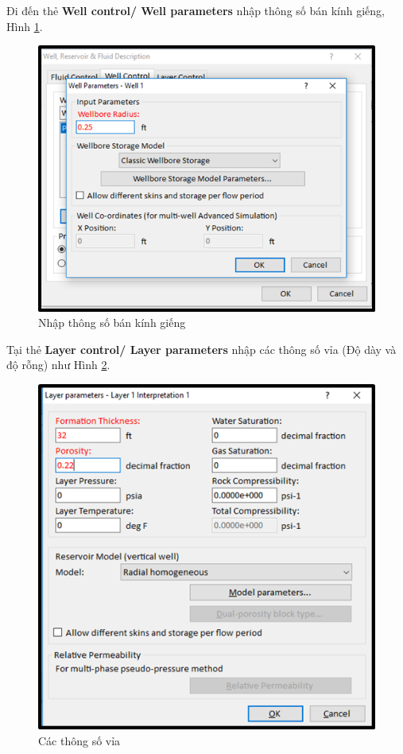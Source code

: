 \documentclass[12pt,a4paper]{report}
\begin{document}
    \clearpage
    \noindent
Đi đến thẻ \textbf{Well control/ Well parameters} nhập thông số bán kính giếng, Hình \ref{fig:w_radius}.
    \begin{figure}[h]
    	\centering
        \includegraphics[scale=1]{welltest/well_radius.png}
        \caption{Nhập thông số bán kính giếng}
        \label{fig:w_radius}
    \end{figure}
    \clearpage
    \noindent
Tại thẻ \textbf{Layer control/ Layer parameters} nhập các thông số vỉa (Độ dày và độ rỗng) như Hình \ref{fig:w_layer}.
    \begin{figure}[h]
    	\centering
        \includegraphics[scale=1]{welltest/layer_params.png}
        \caption{Các thông số vỉa}
        \label{fig:w_layer}
    \end{figure}
\end{document}
